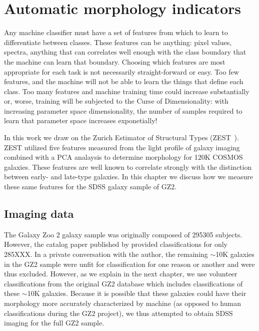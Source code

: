 \section{Automatic morphology indicators}
Any machine classifier must have a set of features from which to learn to differentiate between classes. These features can be anything: pixel values, spectra, anything that can correlates well enough with the class boundary that the machine can learn that boundary. Choosing which features are most appropriate for each task is not necessarily straight-forward or easy. Too few features, and the machine will not be able to learn the things that define each class. Too many features and machine training time could increase substantially or, worse, training will be subjected to the Curse of Dimensionality: with increasing parameter space dimensionality, the number of samples required to learn that parameter space increases exponetially! 

In this work we draw on the Zurich Estimator of Structural Types (ZEST~\citep{Scarlata2007}). ZEST utilized five features measured from the light profile of galaxy imaging combined with a PCA analaysis to determine morphology for 120K COSMOS galaxies. These features are well known to correlate strongly with the distinction between early- and late-type galaxies. In this chapter we discuss how we measure these same features for the SDSS galaxy sample of GZ2. 

\subsection{Imaging data}
The Galaxy Zoo 2 galaxy sample was originally composed of 295305 subjects. However, the catalog paper published by \cite{Willett2013} provided classifications for only 285XXX. In a private conversation with the author, the remaining $\sim$10K galaxies in the GZ2 sample were unfit for classification for one reason or another and were thus excluded. However, as we explain in the next chapter, we use volunteer classifications from the original GZ2 database which includes classifications of these $\sim$10K galaxies. Because it is possible that these galaxies could have their morphology more accurately characterized by machine (as opposed to human classifications during the GZ2 project), we thus attempted to obtain SDSS imaging for the full GZ2 sample. 

